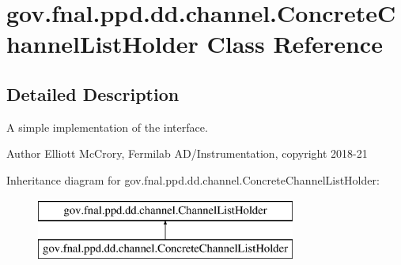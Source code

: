 \hypertarget{classgov_1_1fnal_1_1ppd_1_1dd_1_1channel_1_1ConcreteChannelListHolder}{\section{gov.\-fnal.\-ppd.\-dd.\-channel.\-Concrete\-Channel\-List\-Holder Class Reference}
\label{classgov_1_1fnal_1_1ppd_1_1dd_1_1channel_1_1ConcreteChannelListHolder}
}


\subsection{Detailed Description}
A simple implementation of the interface.

\begin{DoxyAuthor}{Author}
Elliott Mc\-Crory, Fermilab A\-D/\-Instrumentation, copyright 2018-\/21 
\end{DoxyAuthor}
Inheritance diagram for gov.\-fnal.\-ppd.\-dd.\-channel.\-Concrete\-Channel\-List\-Holder\-:\begin{figure}[H]
\begin{center}
\leavevmode
\includegraphics[height=2.000000cm]{classgov_1_1fnal_1_1ppd_1_1dd_1_1channel_1_1ConcreteChannelListHolder}
\end{center}
\end{figure}
